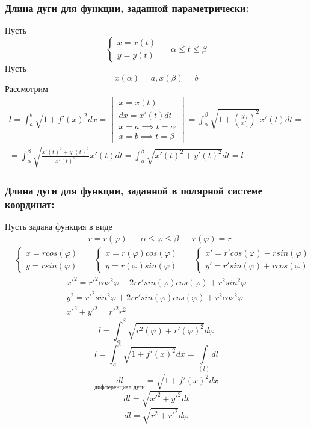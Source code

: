 \documentclass[12pt]{article}
\begin{document}
    \subsubsection*{Длина дуги для функции, заданной параметрически:}
    Пусть
    \[ \begin{cases}
        x=x(t)\\
        y=y(t)
    \end{cases} \;\;\;\;\; \alpha \leq t \leq \beta \]
    Пусть
    \[ x(\alpha)=a, x(\beta)=b \]
    Рассмотрим
    \begin{gather*}
        l=\int_{a}^{b} \sqrt{1+f'(x)^2}dx=
        \begin{vmatrix}
            x=x(t)\\
            dx=x'(t)dt\\
            x=a \implies t=\alpha\\
            x=b \implies t= \beta
        \end{vmatrix}=\int_{\alpha}^{\beta} \sqrt{1+(\frac{y'_t}{x'_t})^2}x'(t)dt =\\
        = \int_{\alpha}^{\beta} \sqrt{\frac{x'(t)^2+y'(t)^2}{x'(t)^2}}x'(t)dt = \boxed{ \int_{\alpha}^{\beta}\sqrt{x'(t)^2+y'(t)^2}dt = l }
    \end{gather*}
    \subsubsection*{Длина дуги для функции, заданной в полярной системе координат:}
    Пусть задана функция в виде
    \begin{align*}
        &r=r(\varphi) & &\alpha \leq \varphi \leq \beta & &r(\varphi)=r
    \end{align*}
    \begin{align*}
        &\begin{cases}
            x=rcos(\varphi)\\
            y=rsin(\varphi)
        \end{cases} & 
        &\begin{cases}
            x=r(\varphi)cos(\varphi)\\
            y=r(\varphi)sin(\varphi)
        \end{cases} & 
        &\begin{cases}
            x'=r'cos(\varphi)-rsin(\varphi)\\
            y'=r'sin(\varphi)+rcos(\varphi)
        \end{cases}
    \end{align*}
    \begin{gather*}
        x'^2=r'^2cos^2\varphi-2rr'sin(\varphi) cos(\varphi)+r^2sin^2\varphi\\
        y^2=r'^2sin^2\varphi+2rr'sin(\varphi) cos(\varphi) + r^2cos^2\varphi\\
        x'^2+y'^2=r'^2r^2
    \end{gather*}
    \[ \boxed{ l=\int_{\alpha}^{\beta} \sqrt{r^2(\varphi)+r'(\varphi)^2}d\varphi } \]
    \[ l=\int_{a}^{b}\sqrt{1+f'(x)^2}dx=\underset{(l)}{\int}dl \]
    \[ \underset{\text{дифференциал дуги}}{dl} = \sqrt{1+f'(x)^2}dx \]
    \[ dl=\sqrt{x'^2+y'^2}dt \]
    \[ dl=\sqrt{r^2+r'^2}d\varphi \]
\end{document}
